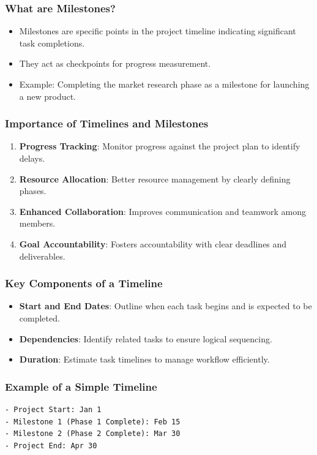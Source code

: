 \documentclass{beamer}
\begin{document}
\begin{frame}[fragile]
    \frametitle{What are Milestones?}
    \begin{itemize}
        \item Milestones are specific points in the project timeline indicating significant task completions.
        \item They act as checkpoints for progress measurement.
        \item Example: Completing the market research phase as a milestone for launching a new product.
    \end{itemize}
\end{frame}

\begin{frame}[fragile]
    \frametitle{Importance of Timelines and Milestones}
    \begin{enumerate}
        \item \textbf{Progress Tracking}: Monitor progress against the project plan to identify delays.
        \item \textbf{Resource Allocation}: Better resource management by clearly defining phases.
        \item \textbf{Enhanced Collaboration}: Improves communication and teamwork among members.
        \item \textbf{Goal Accountability}: Fosters accountability with clear deadlines and deliverables.
    \end{enumerate}
\end{frame}

\begin{frame}[fragile]
    \frametitle{Key Components of a Timeline}
    \begin{itemize}
        \item \textbf{Start and End Dates}: Outline when each task begins and is expected to be completed.
        \item \textbf{Dependencies}: Identify related tasks to ensure logical sequencing.
        \item \textbf{Duration}: Estimate task timelines to manage workflow efficiently.
    \end{itemize}
\end{frame}

\begin{frame}[fragile]
    \frametitle{Example of a Simple Timeline}
    \begin{lstlisting}
- Project Start: Jan 1
- Milestone 1 (Phase 1 Complete): Feb 15
- Milestone 2 (Phase 2 Complete): Mar 30
- Project End: Apr 30
    \end{lstlisting}
\end{frame}
\end{document}
